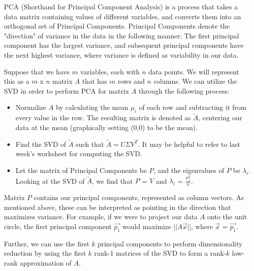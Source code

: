 

PCA (Shorthand for Principal Component Analysis) is a process that takes a data matrix containing values of different variables, and converts them into an orthogonal set of Principal Components. Principal Components denote the "direction" of variance in the data in the following manner: The first principal component has the largest variance, and subsequent principal components have the next highest variance, where variance is defined as variability in our data.

Suppose that we have $m$ variables, each with $n$ data points. We will represent this as a $m$ x $n$ matrix $A$ that has $m$ rows and $n$ columns.
We can utilize the SVD in order to perform PCA for matrix $A$ through the following process:

    \begin{itemize}
        \item Normalize $A$ by calculating the mean $\mu_i$ of each row and subtracting it from every value in the row. The resulting matrix is denoted as $\tilde{A}$, centering our data at the mean (graphically setting (0,0) to be the mean).
        \item Find the SVD of $\tilde{A}$ such that $\tilde{A} = U\Sigma V^T$. It may be helpful to refer to last week's worksheet for computing the SVD.
        \item Let the matrix of Principal Components be $P$, and the eigenvalues of $P$ be $\lambda_i$. Looking at the SVD of $\tilde{A}$, we find that $P$ = $V$ and $\lambda_i$ = $\frac{\sigma_i^2}{n}$.
    \end{itemize}

Matrix $P$ contains our principal components, represented as column vectors. As mentioned above, these can be interpreted as pointing in the direction that maximizes variance. For example, if we were to project our data $A$ onto the unit circle, the first principal component $\vec{p_1}$ would maximize $||A\vec{x}||$, where $\vec{x}$ = $\vec{p_1}$.

Further, we can use the first $k$ principal components to perform dimensionality reduction by using the first $k$ rank-1 matrices of the SVD to form a rank-$k$ low-rank approximation of $A$.

